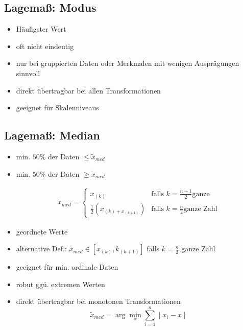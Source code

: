 \documentclass[10pt,a4paper,landscape]{article}
\begin{document}
\begin{multicols}{4}
\subsection{Lagemaß: Modus}
\begin{itemize}
\item Häufigster Wert
\item oft nicht eindeutig
\item nur bei gruppierten Daten oder Merkmalen mit wenigen Ausprägungen sinnvoll
\item direkt übertragbar bei allen Transformationen
\item geeignet für Skalenniveaus
\end{itemize}

\subsection{Lagemaß: Median}
\begin{itemize}
\item min. $50\%$ der Daten $\leqslant \tilde{x}_{med}$
\item min. $50\%$ der Daten $\geqslant \tilde{x}_{med}$ 

\begin{align*}
\tilde{x}_{med}= \begin{cases}
			x_{(k)} & \text{falls } k = \frac{n+1}{2} \text{ganze} \\
			\frac{1}{2}(x_{(k)+x_{(k+1)}}) & \text{falls } k = \frac{n}{2} \text{ganze Zahl} 
\end{cases}
\end{align*}

\item geordnete Werte
\item alternative Def.: $\tilde{x}_{med} \in [x_{(k)},k_{(k+1)}]$ falls $k=\frac{n}{2}$ ganze Zahl
\item geeignet für min. ordinale Daten
\item robut ggü. extremen Werten
\item direkt übertragbar bei monotonen Transformationen
\[
\tilde{x}_{med}=\arg \min_x \sum_{i=1}^n \mid x_i - x \mid
\]
\end{itemize}
				

\end{multicols}
\end{document}
